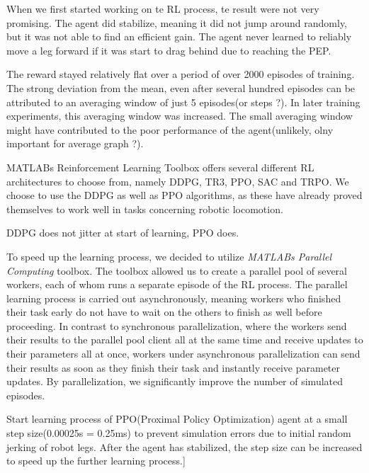 When we first started working on te RL process, te result were not very promising. The agent did stabilize, meaning it did not jump around randomly, but it was not able to find an efficient gain.
The agent never learned to reliably move a leg forward if it was start to drag behind due to reaching the PEP.

The reward stayed relatively flat over a period of over 2000 episodes of training.
The strong deviation from the mean, even after several hundred episodes can be attributed to an averaging window of just 5 episodes(or steps ?). 
In later training experiments, this averaging window was increased.
The small averaging window might have contributed to the poor performance of the agent(unlikely, olny important for average graph ?).

MATLABs Reinforcement Learning Toolbox offers several different RL architectures to choose from, namely DDPG, TR3, PPO, SAC and TRPO.
We choose to use the DDPG as well as PPO algorithms, as these have already proved themselves to work well in tasks concerning robotic locomotion\parencite{FIND AUTHOR}.




DDPG does not jitter at start of learning, PPO does.

To speed up the learning process, we decided to utilize \textit{MATLABs Parallel Computing} toolbox.
The toolbox allowed us to create a parallel pool of several workers, each of whom runs a separate episode of the RL process.
The parallel learning process is carried out asynchronously, meaning workers who finished their task early do not have to wait on the others to finish as well before proceeding.
In contrast to synchronous parallelization, where the workers send their results to the parallel pool client all at the same time and receive updates to their parameters all at once, workers under asynchronous parallelization can send their results as soon as they finish their task and instantly receive parameter updates.
By parallelization, we significantly improve the number of simulated episodes.



Start learning process of PPO(Proximal Policy Optimization) agent at a small step size(0.00025s = 0.25ms) to prevent simulation errors due to initial random jerking of robot legs.
After the agent has stabilized, the step size can be increased to speed up the further learning process.]


